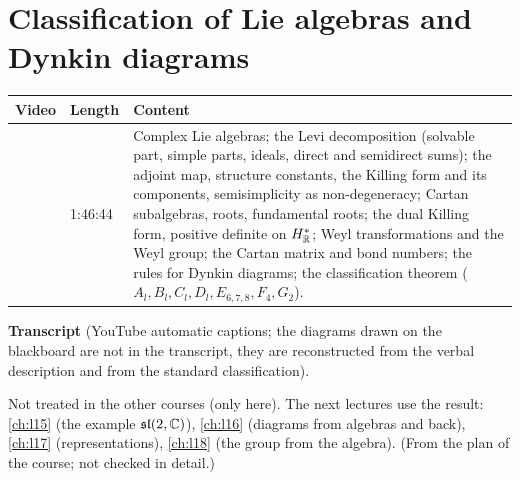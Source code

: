 \chapter{Classification of Lie algebras and Dynkin diagrams}\label{ch:l14}
\begin{paracol}{2}

\begin{sources}
\begin{tabularx}{\linewidth}{@{}l l L@{}}
\toprule
\textbf{Video} & \textbf{Length} & \textbf{Content}\\
\midrule
{} & 1:46:44 & Complex Lie algebras; the Levi decomposition (solvable part, simple parts, ideals, direct and semidirect sums); the adjoint map, structure constants, the Killing form and its components, semisimplicity as non-degeneracy; Cartan subalgebras, roots, fundamental roots; the dual Killing form, positive definite on $H^*_{\mathbb{R}}$; Weyl transformations and the Weyl group; the Cartan matrix and bond numbers; the rules for Dynkin diagrams; the classification theorem ($A_l,B_l,C_l,D_l,E_{6,7,8},F_4,G_2$).\\
\bottomrule
\end{tabularx}

\smallskip
\textbf{Transcript}  (YouTube automatic captions; the diagrams drawn on the blackboard are not in the transcript, they are reconstructed from the verbal description and from the standard classification).
\end{sources}

\begin{reading}
Not treated in the other courses (only here). The next lectures use the result: \cref{ch:l15} (the example $\mathfrak{sl}(2,\mathbb{C})$), \cref{ch:l16} (diagrams from algebras and back), \cref{ch:l17} (representations), \cref{ch:l18} (the group from the algebra). (From the plan of the course; not checked in detail.)
\end{reading}

\newcommand{\dnode}[3]{\draw[fill=white] (#1,#2) circle (0.11);}
\newcommand{\dlab}[3]{\node[below=3pt,font=\scriptsize] at (#1,#2) {#3};}
\newcommand{\dsingle}[3]{\draw (#1+0.11,#3) -- (#2-0.11,#3);}
\newcommand{\ddouble}[4]{\draw (#1+0.11,#3+0.035) -- (#2-0.11,#3+0.035);\draw (#1+0.11,#3-0.035) -- (#2-0.11,#3-0.035);
  \draw (#1/2+#2/2-0.07*#4,#3+0.13) -- (#1/2+#2/2+0.07*#4,#3) -- (#1/2+#2/2-0.07*#4,#3-0.13);}


\end{paracol}
